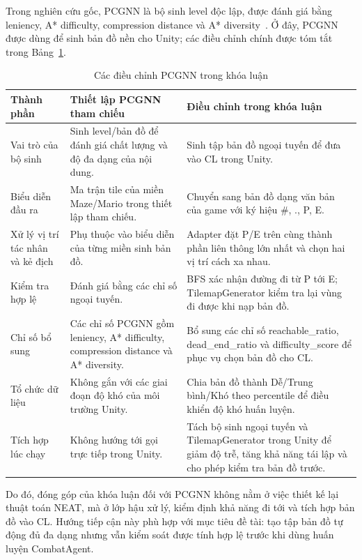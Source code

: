 Trong nghiên cứu gốc, PCGNN là bộ sinh level độc lập, được đánh giá bằng leniency, A* difficulty, compression distance và A* diversity~\cite{Beukman2022}. Ở đây, PCGNN được dùng để sinh bản đồ nền cho Unity; các điều chỉnh chính được tóm tắt trong Bảng~\ref{tab:pcgnn_improvements}.
\begin{table}[H]
    \centering
    \small
    \caption{Các điều chỉnh PCGNN trong khóa luận}
    \label{tab:pcgnn_improvements}
    \begin{tabular}{p{3.0cm} p{5.0cm} p{6.0cm}}
        \toprule
        \textbf{Thành phần} & \textbf{Thiết lập PCGNN tham chiếu} & \textbf{Điều chỉnh trong khóa luận} \\
        \midrule
        Vai trò của bộ sinh & Sinh level/bản đồ để đánh giá chất lượng và độ đa dạng của nội dung. & Sinh tập bản đồ ngoại tuyến để đưa vào CL trong Unity. \\
        Biểu diễn đầu ra & Ma trận tile của miền Maze/Mario trong thiết lập tham chiếu. & Chuyển sang bản đồ dạng văn bản của game với ký hiệu \#, ., P, E. \\
        Xử lý vị trí tác nhân và kẻ địch & Phụ thuộc vào biểu diễn của từng miền sinh bản đồ. & Adapter đặt P/E trên cùng thành phần liên thông lớn nhất và chọn hai vị trí cách xa nhau. \\
        Kiểm tra hợp lệ & Đánh giá bằng các chỉ số ngoại tuyến. & BFS xác nhận đường đi từ P tới E; TilemapGenerator kiểm tra lại vùng đi được khi nạp bản đồ. \\
        Chỉ số bổ sung & Các chỉ số PCGNN gồm leniency, A* difficulty, compression distance và A* diversity. & Bổ sung các chỉ số reachable\_ratio, dead\_end\_ratio và difficulty\_score để phục vụ chọn bản đồ cho CL. \\
        Tổ chức dữ liệu & Không gắn với các giai đoạn độ khó của môi trường Unity. & Chia bản đồ thành Dễ/Trung bình/Khó theo percentile để điều khiển độ khó huấn luyện. \\
        Tích hợp lúc chạy & Không hướng tới gọi trực tiếp trong Unity. & Tách bộ sinh ngoại tuyến và TilemapGenerator trong Unity để giảm độ trễ, tăng khả năng tái lập và cho phép kiểm tra bản đồ trước. \\
        \bottomrule
    \end{tabular}
\end{table}

Do đó, đóng góp của khóa luận đối với PCGNN không nằm ở việc thiết kế lại thuật toán NEAT, mà ở lớp hậu xử lý, kiểm định khả năng đi tới và tích hợp bản đồ vào CL. Hướng tiếp cận này phù hợp với mục tiêu đề tài: tạo tập bản đồ tự động đủ đa dạng nhưng vẫn kiểm soát được tính hợp lệ trước khi dùng huấn luyện CombatAgent.

